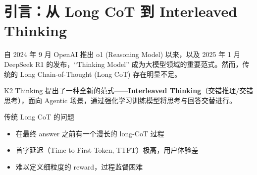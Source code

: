 \section{引言：从 Long CoT 到 Interleaved Thinking}

自 2024 年 9 月 OpenAI 推出 o1 (Reasoning Model) 以来，以及 2025 年 1 月 DeepSeek R1 的发布，``Thinking Model'' 成为大模型领域的重要范式。然而，传统的 Long Chain-of-Thought (Long CoT) 存在明显不足。

K2 Thinking 提出了一种全新的范式------\textbf{Interleaved Thinking}（交错推理/交错思考），面向 Agentic 场景，通过强化学习训练模型将思考与回答交替进行。

\begin{importantbox}{传统 Long CoT 的问题}
\begin{itemize}
  \item 在最终 answer 之前有一个漫长的 long-CoT 过程
  \item 首字延迟（Time to First Token, TTFT）极高，用户体验差
  \item 难以定义细粒度的 reward，过程监督困难
\end{itemize}
\end{importantbox}

